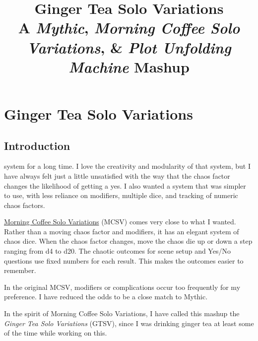 

\title{
\Huge{Ginger Tea Solo Variations}
\\ \small{A \emph{Mythic}, \emph{Morning Coffee Solo Variations}, \& \emph{Plot Unfolding Machine} Mashup}
}


\onecolumn
\frontmatter{}

\mainmatter{}

\chapter*{Ginger Tea Solo Variations \version}

\section{Introduction}
system for a long time. I love the creativity and modularity of that system,
but I have always felt just a little unsatisfied with the way that the chaos
factor changes the likelihood of getting a yes. I also wanted a system
that was simpler to use, with less reliance on modifiers, multiple dice, and
tracking of numeric chaos factors.

\href{https://aleaiactandaest.blogspot.com/p/downloads.html}{Morning Coffee Solo
Variations} (MCSV) comes very close to what I wanted. Rather than a moving chaos
factor and modifiers, it has an elegant system of chaos dice. When the chaos
factor changes, move the chaos die up or down a step ranging from d4 to d20. The
chaotic outcomes for scene setup and Yes/No questions use fixed numbers for each
result. This makes the outcomes easier to remember.

In the original MCSV, modifiers or complications occur too frequently for my
preference. I have reduced the odds to be a close match to Mythic.

In the spirit of Morning Coffee Solo Variations, I have called this mashup the
\emph{Ginger Tea Solo Variations} (GTSV), since I was drinking ginger tea at
least some of the time while working on this.

